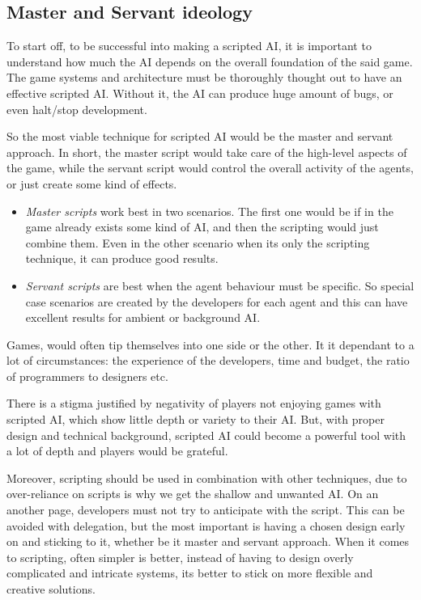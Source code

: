 \documentclass[a4paper, 12pt]{book}
\begin{document}
\subsection{Master and Servant ideology}

To start off, to be successful into making a scripted AI, it is important to understand how much the AI depends on the overall foundation of the said game. The game systems and architecture must be thoroughly thought out to have an effective scripted AI. Without it, the AI can produce huge amount of bugs, or even halt/stop development.

So the most viable technique for scripted AI would be the master and servant approach. In short, the master script would take care of the high-level aspects of the game, while the servant script would control the overall activity of the agents, or just create some kind of effects.  

\begin{itemize}
    \item \emph{Master scripts} work best in two scenarios. The first one would be if in the game already exists some kind of AI, and then the scripting would just combine them. Even in the other scenario when its only the scripting technique, it can produce good results.
    \item \emph{Servant scripts} are best when the agent behaviour must be specific. So special case scenarios are created by the developers for each agent and this can have excellent results for ambient or background AI.
\end{itemize}

Games, would often tip themselves into one side or the other. It it dependant to a lot of circumstances: the experience of the developers, time and budget, the ratio of programmers to designers etc.

There is a stigma justified by negativity of players not enjoying games with scripted AI, which show little depth or variety to their AI. But, with proper design and technical background, scripted AI could become a powerful tool with a lot of depth and players would be grateful.

Moreover, scripting should be used in combination with other techniques, due to over-reliance on scripts is why we get the shallow and unwanted AI. On an another page, developers must not try to anticipate with the script. This can be avoided with delegation, but the most important is having a chosen design early on and sticking to it, whether be it master and servant approach. When it comes to scripting, often simpler is better, instead of having to design overly complicated and intricate systems, its better to stick on more flexible and creative solutions.
\end{document}
